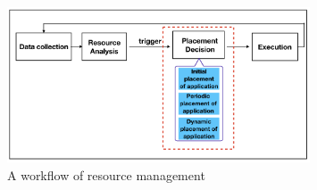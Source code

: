 


\begin{figure}
	\centering
	\includegraphics[width=0.8\textwidth]{pics/workflow_management.png}
	\caption{A workflow of resource management \cite{Mishra:2012kx}}
	\label{fig:workflow}
\end{figure}





